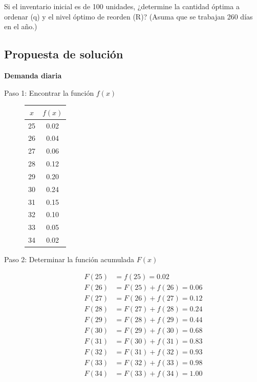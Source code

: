 \documentclass[12pt, a4paper]{article}
\begin{document}
Si el inventario inicial es de 100 unidades, ¿determine la cantidad óptima a ordenar (q) y el nivel óptimo de reorden (R)? (Asuma que se trabajan 260 días en el año.)

\subsection{Propuesta de solución}

\textbf{Demanda diaria}

\begin{description}
    \item[Paso 1: Encontrar la función $f(x)$]

    \begin{center}
    \begin{tabular}{cc}
    \toprule
    $x$ & $f(x)$ \\
    \midrule
    25 & 0.02 \\ 26 & 0.04 \\ 27 & 0.06 \\ 28 & 0.12 \\ 29 & 0.20 \\
    30 & 0.24 \\ 31 & 0.15 \\ 32 & 0.10 \\ 33 & 0.05 \\ 34 & 0.02 \\
    \bottomrule
    \end{tabular}
    \end{center}

    \item[Paso 2: Determinar la función acumulada $F(x)$]

    \begin{align*}
    F(25) &= f(25) = 0.02 \\
    F(26) &= F(25)+f(26) = 0.06 \\
    F(27) &= F(26)+f(27) = 0.12 \\
    F(28) &= F(27)+f(28) = 0.24 \\
    F(29) &= F(28)+f(29) = 0.44 \\
    F(30) &= F(29)+f(30) = 0.68 \\
    F(31) &= F(30)+f(31) = 0.83 \\
    F(32) &= F(31)+f(32) = 0.93 \\
    F(33) &= F(32)+f(33) = 0.98 \\
    F(34) &= F(33)+f(34) = 1.00
    \end{align*}


\end{description}
\end{document}
